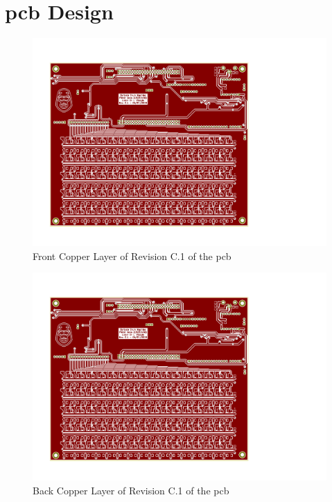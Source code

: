 \documentclass[12pt,a4paper]{report}
\begin{document}
\chapter{\ac{pcb} Design}
\begin{figure}[h!]
	\begin{center}
		\includegraphics[width = \textwidth, trim={0.69in 0.78in 3.1in 0.95in}, clip]{../Skripsie/PCB_05042019.pdf}
		\caption{Front Copper Layer of Revision C.1 of the \ac{pcb}}
		\label{fig:frontpcb}
	\end{center}
\end{figure}
\begin{figure}[h!]
	\begin{center}
		\includegraphics[page=2, width = \textwidth, trim={0.69in 0.78in 3.1in 0.95in}, clip]{../Skripsie/PCB_05042019.pdf}
		\caption{Back Copper Layer of Revision C.1 of the \ac{pcb}}
		\label{fig:backpcb}
	\end{center}
\end{figure}
\end{document}

